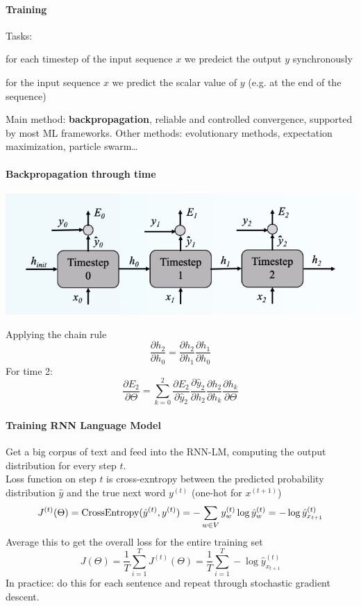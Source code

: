 \documentclass[10pt]{report}
\begin{document}
\paragraph{Training} Tasks:
\begin{list}{}{}
	\item for each timestep of the input sequence $x$ we predeict the output $y$ synchronously
	\item for the input sequence $x$ we predict the scalar value of $y$ (e.g. at the end of the sequence)
\end{list}
Main method: \textbf{backpropagation}, reliable and controlled convergence, supported by most ML frameworks. Other methods: evolutionary methods, expectation maximization, particle swarm\ldots\\
\paragraph{Backpropagation through time}
\begin{center}
	\includegraphics[scale=0.5]{27.png}
\end{center}
Applying the chain rule $$\frac{\partial h_2}{\partial h_0} = \frac{\partial h_2}{\partial h_1}\frac{\partial h_1}{\partial h_0}$$
For time 2:
$$\frac{\partial E_2}{\partial \Theta} = \sum_{k=0}^2\frac{\partial E_2}{\partial \hat{y}_2}\frac{\partial\hat{y}_2}{\partial h_2}\frac{\partial h_2}{\partial h_k}\frac{\partial h_k}{\partial\Theta}$$
\paragraph{Training RNN Language Model} Get a big corpus of text and feed into the RNN-LM, computing the output distribution for every step $t$.\\
Loss function on step $t$ is cross-exntropy between the predicted probability distribution $\hat{y}$ and the true next word $y^{(t)}$ (one-hot for $x^{(t+1)}$)
$$J^{(t)}(\Theta) = \hbox{CrossEntropy}(\hat{y}^{(t)}, y^{(t)}) = -\sum_{w\in V} y_w^{(t)}\log\hat{y}_w^{(t)} = -\log\hat{y}_{x_{t+1}}^{(t)}$$
Average this to get the overall loss for the entire training set
$$J(\Theta) = \frac{1}{T}\sum_{i=1}^T J^{(t)}(\Theta) = \frac{1}{T}\sum_{i=1}^T -\log\hat{y}_{x_{t+1}}^{(t)}$$
In practice: do this for each sentence and repeat through stochastic gradient descent.
\end{document}
